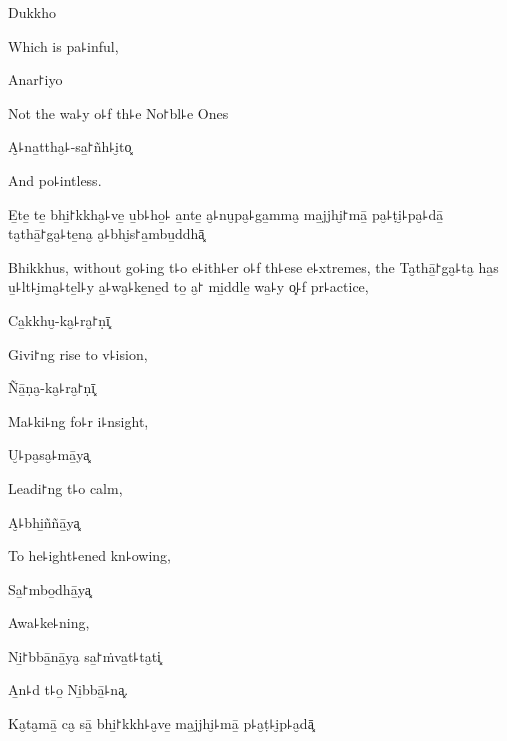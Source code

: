 Dukkho

\begin{english}
  Which is pa꜕inful,
\end{english}

Anar꜓iyo

\begin{english}
  Not the wa꜕y o꜕f th꜕e No꜓bl꜕e Ones
\end{english}

A̮꜕na̱ttha̮꜕-sa̱꜓ñh꜕i̮to͓

\begin{english}
  And po꜕intless.
\end{english}

E̱te̱ te̱ bhi̱꜓kkha̮꜕ve̱ u̱b꜕ho̱꜕ a̱nte̱ a̮꜕nu̮pa̮꜕ga̱mma̮ ma̱jjhi̮꜓mā̱ pa̮꜕ṭi̮꜕pa̮꜕dā̱ ta̮thā̱꜓ga̮꜕te̱na̮ a̮꜕bhi̮s꜓a̱mbu̱ddhā͓

\begin{english}
  Bhikkhus, without go꜕ing t꜕o e꜕ith꜕er o꜕f th꜕ese e꜕xtremes, the
  Ta̮thā̱꜓ga̮꜕ta̮ ha̱s u̱꜕lt꜕i̮ma̮꜕te̱l꜕y a̱꜕wa̮꜕ke̱ne̱d to̱ a̮꜓ mi̱ddle̱ wa̱꜕y o͓꜕f
  pr꜕actice,
\end{english}

Ca̱kkhu̮-ka̮꜕ra̮꜓ṇī͓

\begin{english}
  Givi꜓ng rise to v꜕ision,
\end{english}

Ñā̱ṇa̮-ka̮꜕ra̮꜓ṇī͓

\begin{english}
  Ma꜕ki꜕ng fo꜕r i꜕nsight,
\end{english}

U̮꜕pa̮sa̮꜕mā̱ya͓

\begin{english}
  Leadi꜓ng t꜕o calm,
\end{english}

A̮꜕bhi̱ññā̱ya͓

\begin{english}
  To he꜕ight꜕ened kn꜕owing,
\end{english}

Sa̱꜓mbo̱dhā̱ya͓

\begin{english}
  Awa꜕ke꜕ning,
\end{english}

Ni̱꜓bbā̱nā̱ya̮ sa̱꜓ṁva̱t꜕ta̮ti͓

\begin{english}
  A̱n꜕d t꜕o̱ Ni̱bbā̱꜕na͓.
\end{english}

Ka̮ta̮mā̱ ca̮ sā̱ bhi̱꜓kkh꜕a̮ve̱ ma̱jjhi̮꜕mā̱ p꜕a̮ṭ꜕i̮p꜕a̮dā͓

